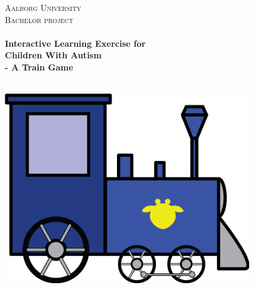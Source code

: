 \begin{titlingpage}\centering



\textsc{\LARGE Aalborg University}\\[0.3cm]

\textsc{\Large Bachelor project}\\[0.3cm]

\HRule \\[0.4cm]
{\huge \bfseries Interactive Learning Exercise for\\Children With Autism}\\[0.5cm]
{\Large \bfseries - A Train Game}

\HRule \\[2cm]

\includegraphics[width=0.8\textwidth]{img/train}

\end{titlingpage}
